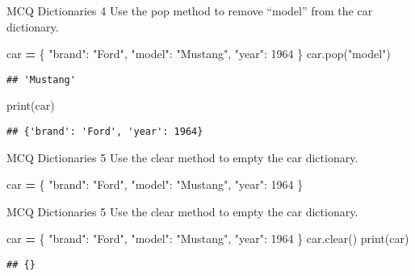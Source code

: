 \documentclass[
  8pt,
  ignorenonframetext,
]{beamer}
\newenvironment{Shaded}{\begin{snugshade}}{\end{snugshade}}
\newcommand{\BuiltInTok}[1]{#1}
\newcommand{\DecValTok}[1]{\textcolor[rgb]{0.00,0.00,0.81}{#1}}
\newcommand{\NormalTok}[1]{#1}
\newcommand{\OperatorTok}[1]{\textcolor[rgb]{0.81,0.36,0.00}{\textbf{#1}}}
\newcommand{\StringTok}[1]{\textcolor[rgb]{0.31,0.60,0.02}{#1}}
\begin{document}
\begin{frame}[fragile]{MCQ Dictionaries 4}
\protect\hypertarget{mcq-dictionaries-4-1}{}
Use the pop method to remove ``model'' from the car dictionary.

\begin{Shaded}
\begin{Highlighting}[]
\NormalTok{car }\OperatorTok{=}\NormalTok{   \{}
  \StringTok{"brand"}\NormalTok{: }\StringTok{"Ford"}\NormalTok{,}
  \StringTok{"model"}\NormalTok{: }\StringTok{"Mustang"}\NormalTok{,}
  \StringTok{"year"}\NormalTok{: }\DecValTok{1964}
\NormalTok{\}}
\NormalTok{car.pop(}\StringTok{"model"}\NormalTok{)}
\end{Highlighting}
\end{Shaded}

\begin{verbatim}
## 'Mustang'
\end{verbatim}

\begin{Shaded}
\begin{Highlighting}[]
\BuiltInTok{print}\NormalTok{(car)}
\end{Highlighting}
\end{Shaded}

\begin{verbatim}
## {'brand': 'Ford', 'year': 1964}
\end{verbatim}
\end{frame}

\begin{frame}[fragile]{MCQ Dictionaries 5}
\protect\hypertarget{mcq-dictionaries-5}{}
Use the clear method to empty the car dictionary.

\begin{Shaded}
\begin{Highlighting}[]
\NormalTok{car }\OperatorTok{=}\NormalTok{   \{}
  \StringTok{"brand"}\NormalTok{: }\StringTok{"Ford"}\NormalTok{,}
  \StringTok{"model"}\NormalTok{: }\StringTok{"Mustang"}\NormalTok{,}
  \StringTok{"year"}\NormalTok{: }\DecValTok{1964}
\NormalTok{\}}
\end{Highlighting}
\end{Shaded}
\end{frame}

\begin{frame}[fragile]{MCQ Dictionaries 5}
\protect\hypertarget{mcq-dictionaries-5-1}{}
Use the clear method to empty the car dictionary.

\begin{Shaded}
\begin{Highlighting}[]
\NormalTok{car }\OperatorTok{=}\NormalTok{   \{}
  \StringTok{"brand"}\NormalTok{: }\StringTok{"Ford"}\NormalTok{,}
  \StringTok{"model"}\NormalTok{: }\StringTok{"Mustang"}\NormalTok{,}
  \StringTok{"year"}\NormalTok{: }\DecValTok{1964}
\NormalTok{\}}
\NormalTok{car.clear()}
\BuiltInTok{print}\NormalTok{(car)}
\end{Highlighting}
\end{Shaded}

\begin{verbatim}
## {}
\end{verbatim}
\end{frame}
\end{document}
